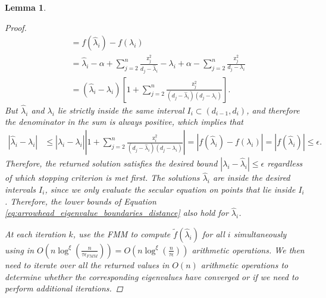\documentclass{article}
\newcommand{\labs}{\left|}
\newcommand{\rabs}{\right|}
\newcommand{\lbrac}{\left[}
\newcommand{\rbrac}{\right]}
\newtheorem{lemma}{Lemma}[section]
\newcommand\vecz{\boldsymbol{\mathrm{z}}}
\newcommand{\cfmm}{\xi}
\begin{document}
\begin{lemma}
\begin{proof}
\begin{align*}
            &= 
            f(\widehat\lambda_i)-f(\lambda_i) 
            \\
            &= 
            \widehat\lambda_i
            -
            \alpha 
            + 
            \sum_{j=2}^n\frac{\vecz_j^2}{d_j-\widehat\lambda_i}
            -
            \lambda_i
            +
            \alpha
            -
            \sum_{j=2}^n\frac{\vecz_j^2}{d_j-\lambda_i}
            \\
            &=
            (\widehat\lambda_i-\lambda_i)
            \lbrac
                1+\sum_{j=2}^n \frac{
                    \vecz_j^2
                }
                {
                    (d_j-\widehat\lambda_i)(d_j-\lambda_i)
                }
            \rbrac.
        \end{align*}
        But $\widehat\lambda_i$ and $\lambda_i$ lie strictly inside the same interval $I_i\subset(d_{i-1},d_i)$, and therefore the denominator in the sum is always positive, which implies that
        \begin{align}
            |\widehat\lambda_i-\lambda_i| 
            &\leq
            |\widehat\lambda_i-\lambda_i| 
            \labs
                1+\sum_{j=2}^n \tfrac{
                    \vecz_i^2
                }
                {
                    (d_j-\widehat\lambda_i)(d_j-\lambda_i)
                }
            \rabs
            =
            \labs
                f(\widehat\lambda_i)-f(\lambda_i)
            \rabs
            =
            \labs
                f(\widehat\lambda_i)
            \rabs
            \leq
            \epsilon.
            \label{eq:lemma_fmm_approximate_eigenvalues}
        \end{align}
        Therefore, the returned solution satisfies the desired bound $|\lambda_i-\widehat\lambda_i|\leq \epsilon$ regardless of which stopping criterion is met first.
        The solutions $\widehat\lambda_i$ are inside the desired intervals $I_i$, since we only evaluate the secular equation on points that lie inside $I_i$. Therefore, the lower bounds of Equation \eqref{eq:arrowhead_eigenvalue_boundaries_distance} also hold for $\widehat\lambda_i$.

        At each iteration $k$, use the FMM to compute $\widetilde f(\widehat\lambda_i)$ for all $i$ simultaneously using in 
        $
        O(n\log^{\cfmm}(\tfrac{n}{\tau\epsilon_{FMM}}))
        =
        O(n\log^{\cfmm}(\tfrac{n}{\tau\epsilon}))
        $ arithmetic operations. We then need to iterate over all the returned values in $O(n)$ arithmetic operations to determine whether the corresponding eigenvalues have converged or if we need to perform additional iterations.


\end{proof}
\end{lemma}
\end{document}
